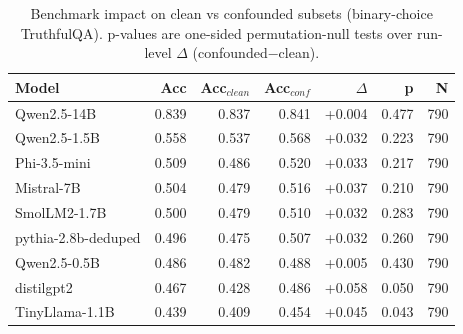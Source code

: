\begin{table}[t]
\centering
\caption{Benchmark impact on clean vs confounded subsets (binary-choice TruthfulQA). p-values are one-sided permutation-null tests over run-level $\Delta$ (confounded$-$clean).}
\label{tab:benchmark_impact}
\begin{tabular}{lrrrrrr}
\toprule
Model & Acc & Acc$_{clean}$ & Acc$_{conf}$ & $\Delta$ & p & N \\
\midrule
Qwen2.5-14B & 0.839 & 0.837 & 0.841 & +0.004 & 0.477 & 790 \\
Qwen2.5-1.5B & 0.558 & 0.537 & 0.568 & +0.032 & 0.223 & 790 \\
Phi-3.5-mini & 0.509 & 0.486 & 0.520 & +0.033 & 0.217 & 790 \\
Mistral-7B & 0.504 & 0.479 & 0.516 & +0.037 & 0.210 & 790 \\
SmolLM2-1.7B & 0.500 & 0.479 & 0.510 & +0.032 & 0.283 & 790 \\
pythia-2.8b-deduped & 0.496 & 0.475 & 0.507 & +0.032 & 0.260 & 790 \\
Qwen2.5-0.5B & 0.486 & 0.482 & 0.488 & +0.005 & 0.430 & 790 \\
distilgpt2 & 0.467 & 0.428 & 0.486 & +0.058 & 0.050 & 790 \\
TinyLlama-1.1B & 0.439 & 0.409 & 0.454 & +0.045 & 0.043 & 790 \\
\bottomrule
\end{tabular}
\end{table}
